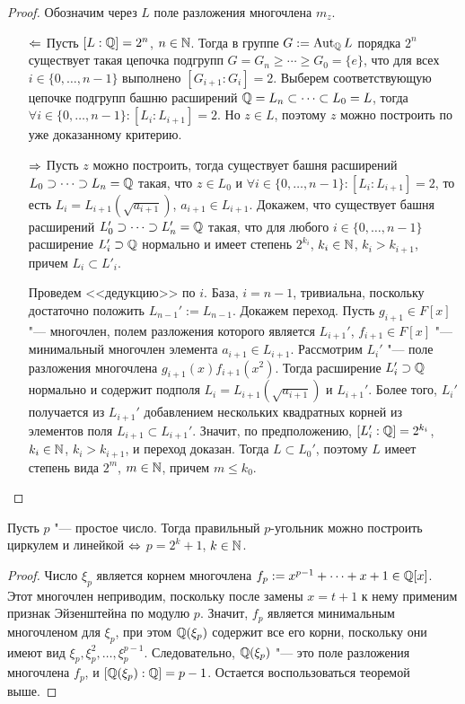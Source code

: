 \begin{proof}
	Обозначим через $L$ поле разложения многочлена $m_{z}$.
	\begin{itemize}
		\item[$\Leftarrow$] Пусть $[L : \mathbb{Q}] = 2^n$, $n \in \mathbb{N}$. Тогда в группе $G := \operatorname{Aut}_{\mathbb{Q}}{L}$ порядка $2^n$ существует такая цепочка подгрупп $G = G_n \ge \dotsb \ge G_0 = \{e\}$, что для всех $i \in \{0, \dotsc, n - 1\}$ выполнено $[G_{i+1} : G_{i}] = 2$. Выберем соответствующую цепочке подгрупп башню расширений $\mathbb{Q} = L_n \subset \dotsb \subset L_0 = L$, тогда $\forall i \in \{0, \dotsc, n-1\}: [L_i : L_{i+1}] = 2$. Но $z \in L$, поэтому $z$ можно построить по уже доказанному критерию.
		
		\item[$\Rightarrow$] Пусть $z$ можно построить, тогда существует башня расширений $L_0 \supset \dotsb \supset L_n = \mathbb{Q}$ такая, что $z \in L_0$ и $\forall i \in \{0, \dotsc, n-1\}: [L_{i} : L_{i + 1}] = 2$, то есть $L_{i} = L_{i + 1}(\sqrt{a_{i+1}})$, $a_{i+1} \in L_{i+1}$. Докажем, что существует башня расширений $L_0' \supset \dotsb \supset L_n' = \mathbb{Q}$ такая, что для любого $i \in \{0, \dotsc, n - 1\}$ расширение $L'_i \supset \mathbb{Q}$ нормально и имеет степень $2^{k_i}$, $k_i \in \mathbb{N}$, $k_i > k_{i+1}$, причем $L_i \subset L'_i$.
		
		Проведем <<дедукцию>> по $i$. База, $i = n - 1$, тривиальна, поскольку достаточно положить $L_{n-1}' := L_{n-1}$. Докажем переход. Пусть $g_{i+1} \in F[x]$ "--- многочлен, полем разложения которого является $L_{i+1}'$, $f_{i+1} \in F[x]$ "--- минимальный многочлен элемента $a_{i+1} \in L_{i+1}$. Рассмотрим $L_i'$ "--- поле разложения многочлена $g_{i+1}(x)f_{i+1}(x^2)$. Тогда расширение $L_i' \supset \mathbb{Q}$ нормально и содержит подполя $L_i = L_{i+1}(\sqrt{a_{i+1}})$ и $L_{i+1}'$. Более того, $L_i'$ получается из $L_{i+1}'$ добавлением нескольких квадратных корней из элементов поля $L_{i+1} \subset L_{i+1}'$. Значит, по предположению, $[L_i' : \mathbb{Q}] = 2^{k_i}$, $k_i \in \mathbb{N}$, $k_i > k_{i+1}$, и переход доказан. Тогда $L \subset L_0'$, поэтому $L$ имеет степень вида $2^m$, $m \in \mathbb{N}$, причем $m \le k_0$.\qedhere
	\end{itemize}
\end{proof}

\begin{corollary}
	Пусть $p$ "--- простое число. Тогда правильный $p$-угольник можно построить циркулем и линейкой $\Leftrightarrow$ $p = 2^k + 1$, $k \in \mathbb{N}$.
\end{corollary}

\begin{proof}
	Число $\xi_p$ является корнем многочлена $f_p := x^{p - 1} + \dotsb + x + 1 \in \mathbb{Q}[x]$. Этот многочлен неприводим, поскольку после замены $x = t + 1$ к нему применим признак Эйзенштейна по модулю $p$. \pagebreak Значит, $f_p$ является минимальным многочленом для $\xi_p$, при этом $\mathbb{Q}(\xi_p)$ содержит все его корни, поскольку они имеют вид $\xi_p, \xi_p^2, \dotsc, \xi_p^{p - 1}$. Следовательно, $\mathbb{Q}(\xi_p)$ "--- это поле разложения многочлена $f_p$, и $[\mathbb{Q}(\xi_p) : \mathbb{Q}] = p - 1$. Остается воспользоваться теоремой выше.
\end{proof}

